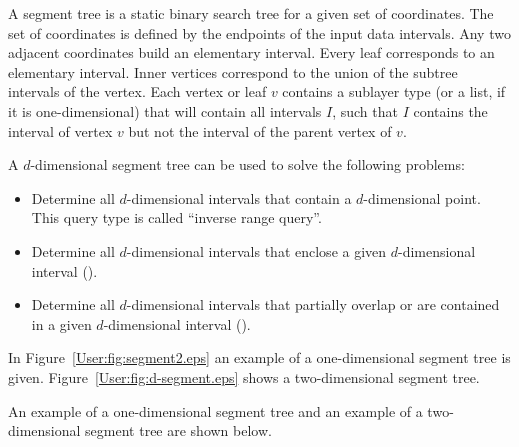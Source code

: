 A segment tree is a static binary search tree for a given set of
coordinates. The set of coordinates is defined by the endpoints
of the input data intervals. Any two adjacent coordinates
build an elementary interval. Every leaf corresponds to an
elementary interval.
Inner vertices
correspond to the union of the subtree intervals of the vertex.
Each vertex or leaf $v$ contains a sublayer type (or a
list, if it is one-dimensional) that will contain all intervals $I$, such that
$I$  contains the interval of vertex $v$ but not the interval
of the parent vertex of $v$.

A $d$-dimensional segment tree can be used to solve the following problems:
\begin{itemize}
\item Determine all $d$-dimensional intervals that contain a
  $d$-dimensional point. This query type is called ``inverse
  range query''.
  \item Determine all $d$-dimensional intervals that enclose a
    given $d$-dimensional interval
    ().
  \item Determine all $d$-dimensional intervals that partially overlap or are
    contained in a given $d$-dimensional interval ().
\end{itemize}

\begin{ccTexOnly}
In Figure~\ref{User:fig:segment2.eps} an example of a one-dimensional segment 
tree is given. Figure~\ref{User:fig:d-segment.eps} shows a two-dimensional
segment tree.
\end{ccTexOnly}

\begin{ccHtmlOnly}
An example of a one-dimensional segment tree and an example
of a two-dimensional segment tree are shown below.
\end{ccHtmlOnly}

